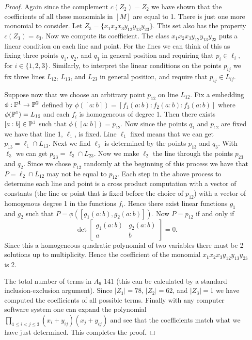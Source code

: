 \documentclass[12pt]{article}
\theoremstyle{plain}
\theoremstyle{definition}
\renewcommand{\P}{\ensuremath \mathbb{P}}
\begin{document}
\begin{proof}
Again since the complement $c(Z_2)=Z_2$ we have shown that the coefficients of all these monomials in $[M]$ are equal to 1. There is just one more monomial to consider. Let $Z_3=\{x_1x_2x_3y_{12}y_{13}y_{23}\}$. This set also has the property $c(Z_3)=z_3$. Now we compute its coefficient. The class $x_1x_2x_3y_{12}y_{13}y_{23}$ puts a linear condition on each line and point. For the lines we can think of this as fixing three points $q_1$, $q_2$, and $q_3$ in general position and requiring that $p_i \in \ell_i$, for $i\in \{1,2,3\}$. Similarly, to interpret the linear conditions on the points $p_{ij}$ we fix three lines $L_{12}$, $L_{13}$, and $L_{23}$ in general position, and require that $p_{ij} \in L_{ij}$. 

Suppose now that we choose an arbitrary point $p_{12}$ on line $L_{12}$. Fix a embedding $\phi :\P^1\to \P^2$ defined by $\phi([a:b])=[f_1(a:b):f_2(a:b):f_3(a:b)]$ where $\phi(\P^1)=L_{12}$ and each $f_i$ is homogeneous of degree 1. Then there exists $[a:b]\in \P^1$ such that $\phi ([a:b])=p_{12}$. Now since the points $q_1$ and $p_{12}$ are fixed we have that line 1, $\ell_1$, is fixed. Line $\ell_1$ fixed means that we can get $p_{13}=\ell_1\cap L_{13}$. Next we find $\ell_3$ is determined by the points $p_{13}$ and $q_3$. With $\ell_3$ we can get $p_{23}=\ell_3\cap L_{23}$. Now we make $\ell_2$ the line through the points $p_{23}$ and $q_2$. Since we chose $p_{12}$ randomly at the beginning of this process we have that $P=\ell_2\cap L_{12}$ may not be equal to $p_{12}$. Each step in the above process to determine each line and point is a cross product computation with a vector of constants (the line or point that is fixed before the choice of $p_{12}$) with a vector of homogenous degree 1 in the functions $f_i$. Hence there exist linear functions $g_1$ and $g_2$ such that $P=\phi([g_1(a:b),g_2(a:b)])$. Now  $P=p_{12}$ if and only if  $$\det \left[ \begin{array}{cc} g_1(a:b)&g_2(a:b)\\
a&b
\end{array}\right] =0.$$ Since this a homogeneous quadratic polynomial of two variables there must be 2 solutions up to multiplicity. Hence the coefficient of the monomial $x_1x_2x_3y_{12}y_{13}y_{23}$ is 2.

The total number of terms in $A_6$ 141 (this can be calculated by a standard inclusion-exclusion argument). Since $|Z_1|=78$, $|Z_2|=62$, and $|Z_3|=1$ we have computed the coefficients of all possible terms. Finally with any computer software system one can expand the polynomial $\prod_{1 \leq i < j \leq 3} (x_i 
+ y_{ij})(x_j + y_{ij})$ and see that the coefficients match what we have just determined. This completes the proof. \end{proof}
\end{document}
